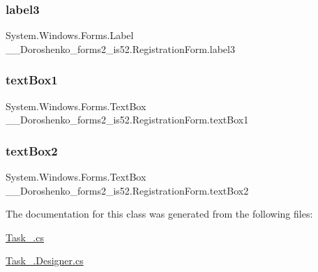 \subsubsection{\texorpdfstring{label3}{label3}}
{\footnotesize\ttfamily System.\+Windows.\+Forms.\+Label \+\_\+\_\+\+Doroshenko\+\_\+forms2\+\_\+is52.\+Registration\+Form.\+label3\hspace{0.3cm}{\ttfamily [private]}}

\hypertarget{class__7___doroshenko__forms2__is52_1_1_registration_form_a060926bb200b7846ce98b37e400b702f}{}\label{class__7___doroshenko__forms2__is52_1_1_registration_form_a060926bb200b7846ce98b37e400b702f} 
\subsubsection{\texorpdfstring{text\+Box1}{textBox1}}
{\footnotesize\ttfamily System.\+Windows.\+Forms.\+Text\+Box \+\_\+\_\+\+Doroshenko\+\_\+forms2\+\_\+is52.\+Registration\+Form.\+text\+Box1\hspace{0.3cm}{\ttfamily [private]}}

\hypertarget{class__7___doroshenko__forms2__is52_1_1_registration_form_adfbd86af9d8bb7f6e3ff355e99f95f47}{}\label{class__7___doroshenko__forms2__is52_1_1_registration_form_adfbd86af9d8bb7f6e3ff355e99f95f47} 
\subsubsection{\texorpdfstring{text\+Box2}{textBox2}}
{\footnotesize\ttfamily System.\+Windows.\+Forms.\+Text\+Box \+\_\+\_\+\+Doroshenko\+\_\+forms2\+\_\+is52.\+Registration\+Form.\+text\+Box2\hspace{0.3cm}{\ttfamily [private]}}



The documentation for this class was generated from the following files\+:\begin{DoxyCompactItemize}
\item 
\hyperlink{_task__8_8cs}{Task\+\_.\+cs}\item 
\hyperlink{_task__8_8_designer_8cs}{Task\+\_.\+Designer.\+cs}\end{DoxyCompactItemize}
